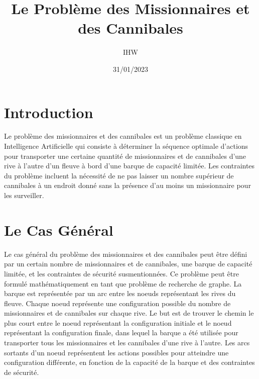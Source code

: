 \documentclass{article}
\title{Le Problème des Missionnaires et des Cannibales}
\author{IHW}
\date{31/01/2023}
\begin{document}
\maketitle

\section{Introduction}
\par Le problème des missionnaires et des cannibales est un problème classique en Intelligence Artificielle qui consiste à déterminer la séquence optimale d'actions pour transporter une certaine quantité de missionnaires et de cannibales d'une rive à l'autre d'un fleuve à bord d'une barque de capacité limitée. Les contraintes du problème incluent la nécessité de ne pas laisser un nombre supérieur de cannibales à un endroit donné sans la présence d'au moins un missionnaire pour les surveiller.

\section{Le Cas Général}
\par Le cas général du problème des missionnaires et des cannibales peut être défini par un certain nombre de missionnaires et de cannibales, une barque de capacité limitée, et les contraintes de sécurité susmentionnées. Ce problème peut être formulé mathématiquement en tant que problème de recherche de graphe. La barque est représentée par un arc entre les noeuds représentant les rives du fleuve. Chaque noeud représente une configuration possible du nombre de missionnaires et de cannibales sur chaque rive.
\newline
Le but est de trouver le chemin le plus court entre le noeud représentant la configuration initiale et le noeud représentant la configuration finale, dans lequel la barque a été utilisée pour transporter tous les missionnaires et les cannibales d'une rive à l'autre. Les arcs sortants d'un noeud représentent les actions possibles pour atteindre une configuration différente, en fonction de la capacité de la barque et des contraintes de sécurité.
\end{document}

